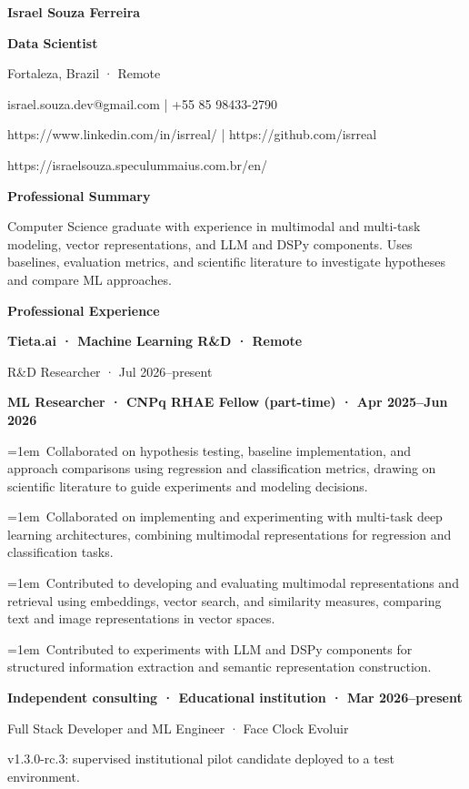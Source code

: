 \documentclass[a4paper,10pt]{article}
\begin{document}
\textbf{Israel Souza Ferreira}\par
\textbf{Data Scientist}\par
Fortaleza, Brazil · Remote\par
israel.souza.dev@gmail.com | +55 85 98433-2790\par
https://www.linkedin.com/in/isrreal/ | https://github.com/isrreal\par
https://israelsouza.speculummaius.com.br/en/\par
\vspace{5pt}\textbf{Professional Summary}\par
Computer Science graduate with experience in multimodal and multi-task modeling, vector representations, and LLM and DSPy components. Uses baselines, evaluation metrics, and scientific literature to investigate hypotheses and compare ML approaches.\par
\vspace{5pt}\textbf{Professional Experience}\par
\textbf{Tieta.ai · Machine Learning R\&D · Remote}\par
R\&D Researcher · Jul 2026–present\par
\textbf{ML Researcher · CNPq RHAE Fellow (part-time) · Apr 2025–Jun 2026}\par
\hangindent=1em\textbullet\ Collaborated on hypothesis testing, baseline implementation, and approach comparisons using regression and classification metrics, drawing on scientific literature to guide experiments and modeling decisions.\par
\hangindent=1em\textbullet\ Collaborated on implementing and experimenting with multi-task deep learning architectures, combining multimodal representations for regression and classification tasks.\par
\hangindent=1em\textbullet\ Contributed to developing and evaluating multimodal representations and retrieval using embeddings, vector search, and similarity measures, comparing text and image representations in vector spaces.\par
\hangindent=1em\textbullet\ Contributed to experiments with LLM and DSPy components for structured information extraction and semantic representation construction.\par
\textbf{Independent consulting · Educational institution · Mar 2026–present}\par
Full Stack Developer and ML Engineer · Face Clock Evoluir\par
v1.3.0-rc.3: supervised institutional pilot candidate deployed to a test environment.\par
\end{document}
